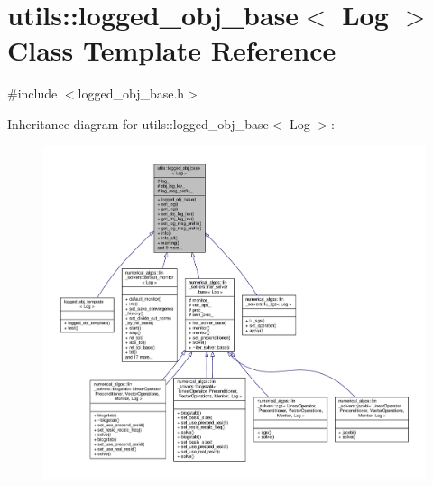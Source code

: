 \hypertarget{classutils_1_1logged__obj__base}{\section{utils\-:\-:logged\-\_\-obj\-\_\-base$<$ Log $>$ Class Template Reference}
\label{classutils_1_1logged__obj__base}
}


{\ttfamily \#include $<$logged\-\_\-obj\-\_\-base.\-h$>$}



Inheritance diagram for utils\-:\-:logged\-\_\-obj\-\_\-base$<$ Log $>$\-:
\nopagebreak
\begin{figure}[H]
\begin{center}
\leavevmode
\includegraphics[width=350pt]{classutils_1_1logged__obj__base__inherit__graph}
\end{center}
\end{figure}


